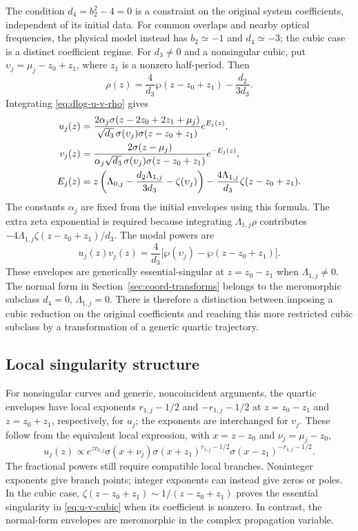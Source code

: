 \documentclass[11pt,a4paper]{article}
\numberwithin{equation}{section}
\begin{document}
The condition $d_4=b_2^2-4=0$ is a constraint on the original system coefficients, independent of its initial data.
For common overlaps and nearby optical frequencies, the physical model instead has $b_2\simeq-1$ and $d_4\simeq-3$; the cubic case is a distinct coefficient regime.
For $d_3\ne0$ and a nonsingular cubic, put $\upsilon_j=\mu_j-z_0+z_1$, where $z_1$ is a nonzero half-period.
Then
\begin{equation}
\rho(z)=\frac{4}{d_3}\wp(z-z_0+z_1)-\frac{d_2}{3d_3}.
\end{equation}
Integrating \eqref{eq:dlog-u-v-rho} gives
\begin{align}
u_j(z)&=\frac{2\alpha_j\sigma(z-2z_0+2z_1+\mu_j)}{\sqrt{d_3}\,\sigma(\upsilon_j)\sigma(z-z_0+z_1)}e^{E_j(z)},\notag\\
v_j(z)&=\frac{2\sigma(z-\mu_j)}{\alpha_j\sqrt{d_3}\,\sigma(\upsilon_j)\sigma(z-z_0+z_1)}e^{-E_j(z)},\notag\\
E_j(z)&=z\left(\Lambda_{0,j}-\frac{d_2\Lambda_{1,j}}{3d_3}-\zeta(\upsilon_j)\right)
-\frac{4\Lambda_{1,j}}{d_3}\zeta(z-z_0+z_1).
\label{eq:u-v-cubic}
\end{align}
The constants $\alpha_j$ are fixed from the initial envelopes using this formula.
The extra zeta exponential is required because integrating $\Lambda_{1,j}\rho$ contributes $-4\Lambda_{1,j}\zeta(z-z_0+z_1)/d_3$.
The modal powers are
\begin{equation}
u_j(z)v_j(z)=\frac{4}{d_3}\bigl[\wp(\upsilon_j)-\wp(z-z_0+z_1)\bigr].
\label{eq:modal-power-cubic}
\end{equation}
These envelopes are generically essential-singular at $z=z_0-z_1$ when $\Lambda_{1,j}\ne0$.
The normal form in Section~\ref{sec:coord-transforms} belongs to the meromorphic subclass $d_4=0$, $\Lambda_{1,j}=0$.
There is therefore a distinction between imposing a cubic reduction on the original coefficients and reaching this more restricted cubic subclass by a transformation of a generic quartic trajectory.

\subsection*{Local singularity structure}
For nonsingular curves and generic, noncoincident arguments, the quartic envelopes have local exponents $r_{1,j}-1/2$ and $-r_{1,j}-1/2$ at $z=z_0-z_1$ and $z=z_0+z_1$, respectively, for $u_j$; the exponents are interchanged for $v_j$.
These follow from the equivalent local expression, with $x=z-z_0$ and $\nu_j=\mu_j-z_0$,
\begin{equation}
u_j(z)\propto e^{zr_{0,j}}\sigma(x+\nu_j)
\sigma(x+z_1)^{r_{1,j}-1/2}\sigma(x-z_1)^{-r_{1,j}-1/2}.
\end{equation}
The fractional powers still require compatible local branches.
Noninteger exponents give branch points; integer exponents can instead give zeros or poles.
In the cubic case, $\zeta(z-z_0+z_1)\sim1/(z-z_0+z_1)$ proves the essential singularity in \eqref{eq:u-v-cubic} when its coefficient is nonzero.
In contrast, the normal-form envelopes are meromorphic in the complex propagation variable.
\end{document}
